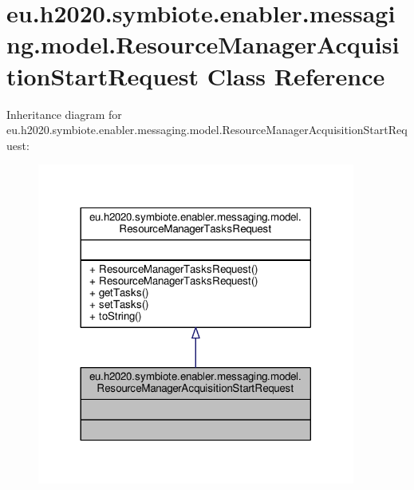 \hypertarget{classeu_1_1h2020_1_1symbiote_1_1enabler_1_1messaging_1_1model_1_1ResourceManagerAcquisitionStartRequest}{}\section{eu.\+h2020.\+symbiote.\+enabler.\+messaging.\+model.\+Resource\+Manager\+Acquisition\+Start\+Request Class Reference}
\label{classeu_1_1h2020_1_1symbiote_1_1enabler_1_1messaging_1_1model_1_1ResourceManagerAcquisitionStartRequest}


Inheritance diagram for eu.\+h2020.\+symbiote.\+enabler.\+messaging.\+model.\+Resource\+Manager\+Acquisition\+Start\+Request\+:
\nopagebreak
\begin{figure}[H]
\begin{center}
\leavevmode
\includegraphics[width=296pt]{classeu_1_1h2020_1_1symbiote_1_1enabler_1_1messaging_1_1model_1_1ResourceManagerAcquisitionStartRequest__inherit__graph}
\end{center}
\end{figure}



